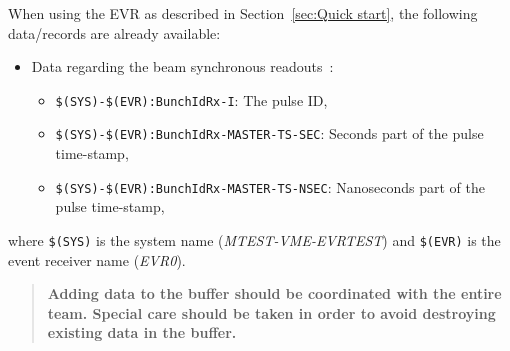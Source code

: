 \documentclass[12pt,a4paper]{article}
\begin{document}
When using the EVR as described in Section~\ref{sec:Quick start}, the following data/records are already available:
\begin{itemize}
\item Data regarding the beam synchronous readouts~\cite{bsread}:
	\begin{itemize}
	\item \texttt{\$(SYS)-\$(EVR):BunchIdRx-I}: The pulse ID,
	\item \texttt{\$(SYS)-\$(EVR):BunchIdRx-MASTER-TS-SEC}: Seconds part of the pulse time-stamp,
	\item \texttt{\$(SYS)-\$(EVR):BunchIdRx-MASTER-TS-NSEC}: Nanoseconds part of the pulse time-stamp,
	\end{itemize}
\end{itemize}
where \texttt{\$(SYS)} is the system name (\textit{MTEST-VME-EVRTEST}) and \texttt{\$(EVR)} is the event receiver name (\textit{EVR0}).

\begin{quote}
\textbf{Adding data to the buffer should be coordinated with the entire team. Special care should be taken in order to avoid destroying existing data in the buffer.}
\end{quote}
\end{document}
